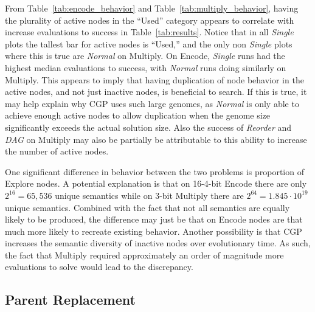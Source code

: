 \documentclass[journal]{IEEEtran}
\begin{document}
From Table~\ref{tab:encode_behavior} and Table~\ref{tab:multiply_behavior}, having
the plurality of active nodes in the ``Used'' category appears to correlate with
increase evaluations to success in Table~\ref{tab:results}.  Notice that in all \emph{Single} plots the
tallest bar for active nodes is ``Used,'' and the only non \emph{Single} plots
where this is true are \emph{Normal} on Multiply.  On Encode, \emph{Single}
runs had the highest median evaluations to success, with \emph{Normal} runs
doing similarly on Multiply.  This appears to imply that having duplication
of node behavior in the active nodes, and not just inactive nodes, is beneficial
to search.  If this is true, it may help explain why CGP uses such large genomes,
as \emph{Normal} is only able to achieve enough active nodes to allow duplication
when the genome size significantly exceeds the actual solution size.  Also
the success of \emph{Reorder} and \emph{DAG} on Multiply may also be partially be attributable
to this ability to increase the number of active nodes.

One significant difference in behavior between the two problems is proportion of
Explore nodes.  A potential explanation is that on 16-4-bit Encode there are only
$2^{16} = 65,536$ unique semantics while on 3-bit Multiply there are $2^{64} = 1.845\cdot 10^{19}$
unique semantics.  Combined with the fact that not all semantics are equally
likely to be produced, the difference may just be that on Encode nodes are
that much more likely to recreate existing behavior.  Another possibility is that
CGP increases the semantic diversity of inactive nodes over evolutionary time.
As such, the fact that Multiply required approximately an order of magnitude more
evaluations to solve would lead to the discrepancy.

\subsection{Parent Replacement}
\end{document}
